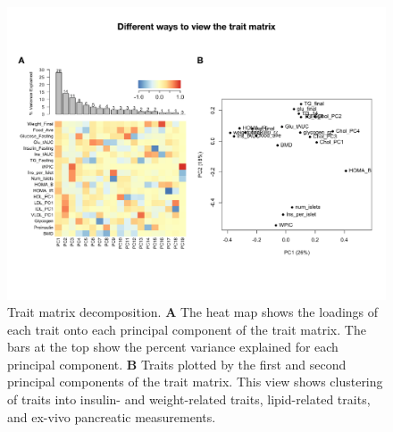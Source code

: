 \documentclass[
]{article}
\begin{document}
\begin{figure}[ht!]
\includegraphics[width=\textwidth]{Figures/Supp_Fig_Trait_Decomposition.pdf} 
\caption{Trait matrix decomposition. \textbf{A} The heat map 
shows the loadings of each trait onto each principal component 
of the trait matrix. The bars at the top show the percent variance 
explained for each principal component. \textbf{B} Traits plotted 
by the first and second principal components of the trait matrix. 
This view shows clustering of traits into insulin- and 
weight-related traits, lipid-related traits, and ex-vivo 
pancreatic measurements.
}
\label{fig:trait_decomp}
\end{figure}
\end{document}
